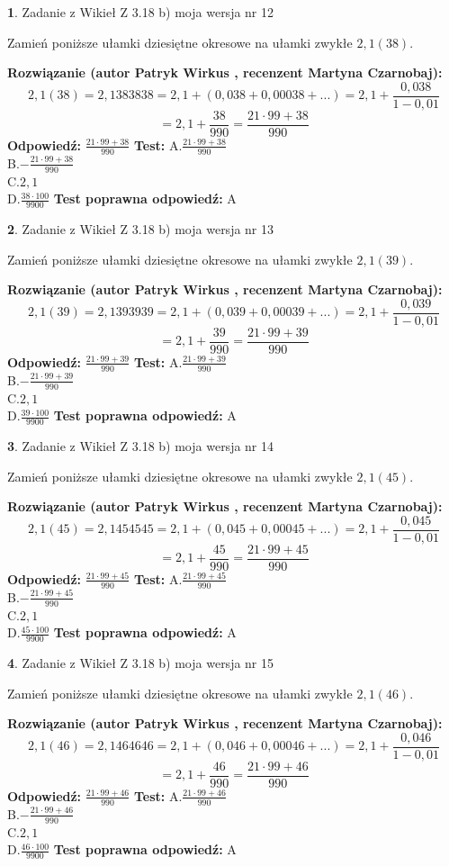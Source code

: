 \documentclass[12pt, a4paper]{article}
\theoremstyle{definition} %
\newtheorem{zad}{}
\newcommand{\zadStart}[1]{\begin{zad}#1\newline}
\newcommand{\zadStop}{\end{zad}}
\newcommand{\rozwStart}[2]{\noindent \textbf{Rozwiązanie (autor #1 , recenzent #2): }\newline}
\newcommand{\rozwStop}{\newline}
\newcommand{\odpStart}{\noindent \textbf{Odpowiedź:}\newline}
\newcommand{\odpStop}{\newline}
\newcommand{\testStart}{\noindent \textbf{Test:}\newline}
\newcommand{\testStop}{\newline}
\newcommand{\kluczStart}{\noindent \textbf{Test poprawna odpowiedź:}\newline}
\newcommand{\kluczStop}{\newline}
\begin{document}
\zadStart{Zadanie z Wikieł Z 3.18 b) moja wersja nr 12}

Zamień poniższe ułamki dziesiętne okresowe na ułamki zwykłe $2,1(38)$.
\zadStop
\rozwStart{Patryk Wirkus}{Martyna Czarnobaj}
$$2,1(38)=2,1383838=2,1+(0,038+0,00038+...)=2,1+\frac{0,038}{1-0,01}$$
$$=2,1+\frac{38}{990}=\frac{21\cdot99+38}{990}$$
\rozwStop
\odpStart
$\frac{21\cdot99+38}{990}$
\odpStop
\testStart
A.$\frac{21\cdot99+38}{990}$\\ B.$-\frac{21\cdot99+38}{990}$\\ C.$2,1$\\ D.$\frac{38\cdot100}{9900}$
\testStop
\kluczStart
A
\kluczStop



\zadStart{Zadanie z Wikieł Z 3.18 b) moja wersja nr 13}

Zamień poniższe ułamki dziesiętne okresowe na ułamki zwykłe $2,1(39)$.
\zadStop
\rozwStart{Patryk Wirkus}{Martyna Czarnobaj}
$$2,1(39)=2,1393939=2,1+(0,039+0,00039+...)=2,1+\frac{0,039}{1-0,01}$$
$$=2,1+\frac{39}{990}=\frac{21\cdot99+39}{990}$$
\rozwStop
\odpStart
$\frac{21\cdot99+39}{990}$
\odpStop
\testStart
A.$\frac{21\cdot99+39}{990}$\\ B.$-\frac{21\cdot99+39}{990}$\\ C.$2,1$\\ D.$\frac{39\cdot100}{9900}$
\testStop
\kluczStart
A
\kluczStop



\zadStart{Zadanie z Wikieł Z 3.18 b) moja wersja nr 14}

Zamień poniższe ułamki dziesiętne okresowe na ułamki zwykłe $2,1(45)$.
\zadStop
\rozwStart{Patryk Wirkus}{Martyna Czarnobaj}
$$2,1(45)=2,1454545=2,1+(0,045+0,00045+...)=2,1+\frac{0,045}{1-0,01}$$
$$=2,1+\frac{45}{990}=\frac{21\cdot99+45}{990}$$
\rozwStop
\odpStart
$\frac{21\cdot99+45}{990}$
\odpStop
\testStart
A.$\frac{21\cdot99+45}{990}$\\ B.$-\frac{21\cdot99+45}{990}$\\ C.$2,1$\\ D.$\frac{45\cdot100}{9900}$
\testStop
\kluczStart
A
\kluczStop



\zadStart{Zadanie z Wikieł Z 3.18 b) moja wersja nr 15}

Zamień poniższe ułamki dziesiętne okresowe na ułamki zwykłe $2,1(46)$.
\zadStop
\rozwStart{Patryk Wirkus}{Martyna Czarnobaj}
$$2,1(46)=2,1464646=2,1+(0,046+0,00046+...)=2,1+\frac{0,046}{1-0,01}$$
$$=2,1+\frac{46}{990}=\frac{21\cdot99+46}{990}$$
\rozwStop
\odpStart
$\frac{21\cdot99+46}{990}$
\odpStop
\testStart
A.$\frac{21\cdot99+46}{990}$\\ B.$-\frac{21\cdot99+46}{990}$\\ C.$2,1$\\ D.$\frac{46\cdot100}{9900}$
\testStop
\kluczStart
A
\kluczStop
\end{document}
